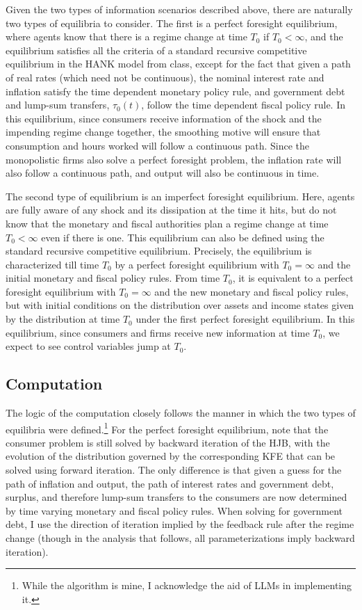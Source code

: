 \documentclass[11pt]{article}
\begin{document}
Given the two types of information scenarios described above, there are naturally two types of equilibria to consider. The first is a perfect foresight equilibrium, where agents know that there is a regime change at time $T_0$ if $T_0 < \infty$, and the equilibrium satisfies all the criteria of a standard recursive competitive equilibrium in the HANK model from class, except for the fact that given a path of real rates (which need not be continuous), the nominal interest rate and inflation satisfy the time dependent monetary policy rule, and government debt and lump-sum transfers, $\tau_0(t)$, follow the time dependent fiscal policy rule. In this equilibrium, since consumers receive information of the shock and the impending regime change together, the smoothing motive will ensure that consumption and hours worked will follow a continuous path. Since the monopolistic firms also solve a perfect foresight problem, the inflation rate will also follow a continuous path, and output will also be continuous in time.

The second type of equilibrium is an imperfect foresight equilibrium. Here, agents are fully aware of any shock and its dissipation at the time it hits, but do not know that the monetary and fiscal authorities plan a regime change at time $T_0 < \infty$ even if there is one. This equilibrium can also be defined using the standard recursive competitive equilibrium. Precisely, the equilibrium is characterized till time $T_0$ by a perfect foresight equilibrium with $T_0 = \infty$ and the initial monetary and fiscal policy rules. From time $T_0$, it is equivalent to a perfect foresight equilibrium with $T_0 = \infty$ and the new monetary and fiscal policy rules, but with initial conditions on the distribution over assets and income states given by the distribution at time $T_0$ under the first perfect foresight equilibrium. In this equilibrium, since consumers and firms receive new information at time $T_0$, we expect to see control variables jump at $T_0$.

\subsection{Computation}

The logic of the computation closely follows the manner in which the two types of equilibria were defined.\footnote{While the algorithm is mine, I acknowledge the aid of LLMs in implementing it.} For the perfect foresight equilibrium, note that the consumer problem is still solved by backward iteration of the HJB, with the evolution of the distribution governed by the corresponding KFE that can be solved using forward iteration. The only difference is that given a guess for the path of inflation and output, the path of interest rates and government debt, surplus, and therefore lump-sum transfers to the consumers are now determined by time varying monetary and fiscal policy rules. When solving for government debt, I use the direction of iteration implied by the feedback rule after the regime change (though in the analysis that follows, all parameterizations imply backward iteration).
\end{document}
